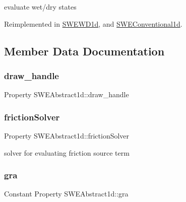 evaluate wet/dry states 



Reimplemented in \hyperlink{class_s_w_e_w_d1d_aac1cdc6c307e100a9d133b145950459e}{S\+W\+E\+W\+D1d}, and \hyperlink{class_s_w_e_conventional1d_ab27cfc5d7b7c7489425cb1cddd1bce16}{S\+W\+E\+Conventional1d}.



\subsection{Member Data Documentation}
\mbox{\label{class_s_w_e_abstract1d_aa89afba8994c2523cf31f3f7c0dae222}} 
\subsubsection{\texorpdfstring{draw\+\_\+handle}{draw\_handle}}
{\footnotesize\ttfamily Property S\+W\+E\+Abstract1d\+::draw\+\_\+handle}

\mbox{\label{class_s_w_e_abstract1d_a45882d6eb9eeba9ac39247bb3e3823df}} 
\subsubsection{\texorpdfstring{friction\+Solver}{frictionSolver}}
{\footnotesize\ttfamily Property S\+W\+E\+Abstract1d\+::friction\+Solver}



solver for evaluating friction source term 

\mbox{\label{class_s_w_e_abstract1d_ae7a30e37952871379dac6774112b1828}} 
\subsubsection{\texorpdfstring{gra}{gra}}
{\footnotesize\ttfamily Constant Property S\+W\+E\+Abstract1d\+::gra}



